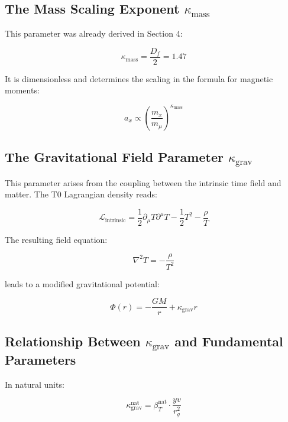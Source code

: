 \documentclass[12pt,a4paper]{article}
\begin{document}
	\subsection{The Mass Scaling Exponent $\kappa_{\text{mass}}$}
	
	This parameter was already derived in Section 4:
	
	\begin{equation}
		\kappa_{\text{mass}} = \frac{D_f}{2} = 1.47
	\end{equation}
	
	It is dimensionless and determines the scaling in the formula for magnetic moments:
	
	\begin{equation}
		a_x \propto \left(\frac{m_x}{m_\mu}\right)^{\kappa_{\text{mass}}}
	\end{equation}
	
	\subsection{The Gravitational Field Parameter $\kappa_{\text{grav}}$}
	
	This parameter arises from the coupling between the intrinsic time field and matter. The T0 Lagrangian density reads:
	
	\begin{equation}
		\mathcal{L}_{\text{intrinsic}} = \frac{1}{2}\partial_\mu T \partial^\mu T - \frac{1}{2}T^2 - \frac{\rho}{T}
	\end{equation}
	
	The resulting field equation:
	
	\begin{equation}
		\nabla^2 T = -\frac{\rho}{T^2}
	\end{equation}
	
	leads to a modified gravitational potential:
	
	\begin{equation}
		\Phi(r) = -\frac{GM}{r} + \kappa_{\text{grav}} r
	\end{equation}
	
	\subsection{Relationship Between $\kappa_{\text{grav}}$ and Fundamental Parameters}
	
	In natural units:
	
	\begin{equation}
		\kappa_{\text{grav}}^{\text{nat}} = \beta_T^{\text{nat}} \cdot \frac{yv}{r_g^2}
	\end{equation}
	
\end{document}
